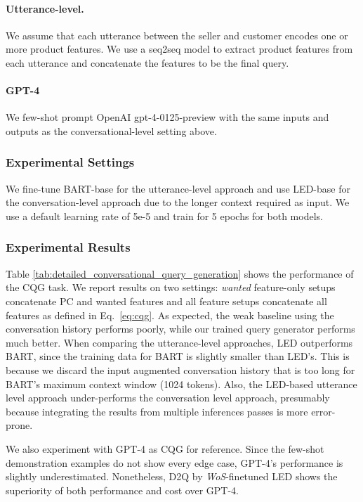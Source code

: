 \paragraph{Utterance-level.} We assume that each utterance between the seller and customer encodes one or more product features. We use a seq2seq model to extract product features from each utterance and concatenate the features to be the final query.
\paragraph{GPT-4} We few-shot prompt OpenAI gpt-4-0125-preview with the same inputs and outputs as the conversational-level setting above.

\subsubsection{Experimental Settings}
We fine-tune BART-base \cite{lewis-etal-2020-bart} for the utterance-level approach and use LED-base \cite{beltagy2020longformer} for the conversation-level approach due to the longer context required as input. %
We use a default learning rate of 5e-5 and train for 5 epochs for both models. 

\subsubsection{Experimental Results}
Table \ref{tab:detailed_conversational_query_generation} shows the performance of the CQG task. We report results on two settings: \textit{wanted} feature-only setups concatenate PC and wanted features and all feature setups concatenate all features as defined in Eq.~\ref{eq:cqg}. As expected, the weak baseline using the conversation history performs poorly, while our trained query generator performs much better.  
When comparing the utterance-level approaches, LED outperforms BART, since the training data for BART is slightly smaller than LED's. This is because we discard the input augmented conversation history that is too long for BART's maximum context window (1024 tokens). Also, the LED-based utterance level approach under-performs the conversation level approach, presumably because integrating the results from multiple inferences passes is more error-prone. 

We also experiment with GPT-4 as CQG for reference. Since the few-shot demonstration examples do not show every edge case, GPT-4's performance is slightly underestimated. Nonetheless, D2Q by \textit{WoS}-finetuned LED shows the superiority of both performance and cost over GPT-4.
